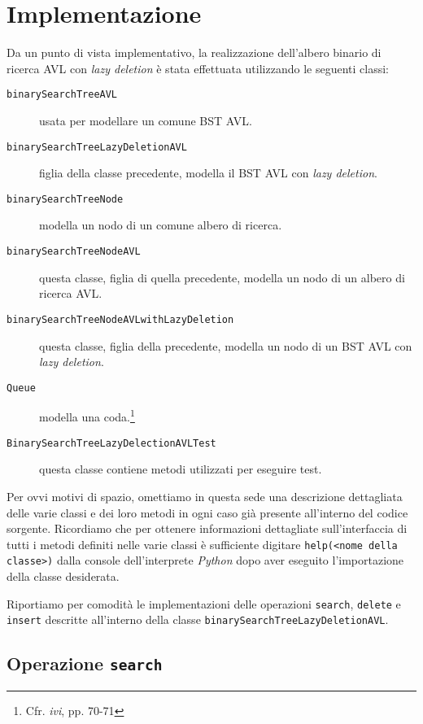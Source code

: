 \documentclass[10pt,a4paper,titlepage]{article}
\begin{document}
\section{Implementazione}

Da un punto di vista implementativo, la realizzazione dell'albero binario di ricerca AVL con \textit{lazy deletion} è stata effettuata utilizzando le seguenti classi:

\begin{description}
\item[\texttt{binarySearchTreeAVL}] usata per modellare un comune BST AVL.
\item[\texttt{binarySearchTreeLazyDeletionAVL}] figlia della classe precedente, modella il BST AVL con \textit{lazy deletion}.
\item[\texttt{binarySearchTreeNode}] modella un nodo di un comune albero di ricerca.
\item[\texttt{binarySearchTreeNodeAVL}] questa classe, figlia di quella precedente, modella un nodo di un albero di ricerca AVL.
\item[\texttt{binarySearchTreeNodeAVLwithLazyDeletion}] questa classe, figlia della precedente, modella un nodo di un BST AVL con \textit{lazy deletion}.

\item[\texttt{Queue}] modella una coda.\footnote{Cfr. \textit{ivi}, pp. 70-71}

\item[\texttt{BinarySearchTreeLazyDelectionAVLTest}] questa classe contiene metodi utilizzati per eseguire test.

\end{description}
 
Per ovvi motivi di spazio, omettiamo in questa sede una descrizione dettagliata delle varie classi e dei loro metodi in ogni caso già presente all'interno del codice sorgente. Ricordiamo che per ottenere informazioni dettagliate sull'interfaccia di tutti i metodi definiti nelle varie classi è sufficiente digitare \texttt{help(<nome della classe>)} dalla console dell'interprete \textit{Python} dopo aver eseguito l'importazione della classe desiderata.

Riportiamo per comodità le implementazioni delle operazioni \texttt{search}, \texttt{delete} e \texttt{insert} descritte all'interno della classe \texttt{binarySearchTreeLazyDeletionAVL}.

\subsection{Operazione \texttt{search}}
\end{document}
